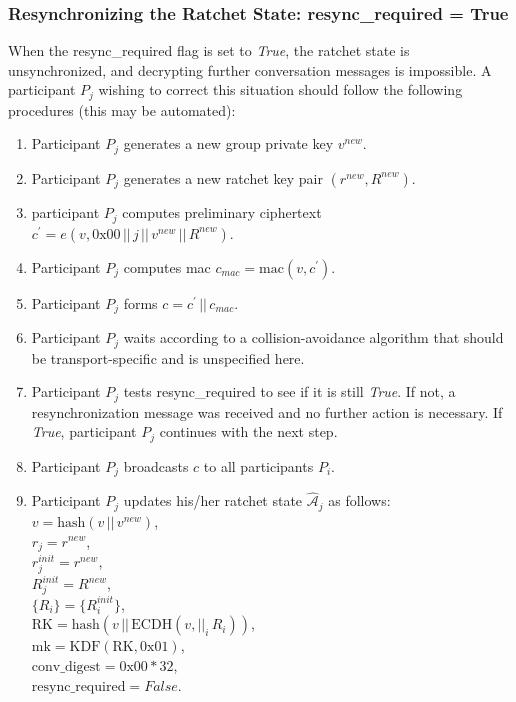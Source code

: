 \documentclass[%
preprint,
amsmath,amssymb,
aps,
prb,
floatfix,
]{revtex4-1}
\begin{document}
\subsubsection{\label{sec:sendresync}Resynchronizing the Ratchet State:
resync\_required = True}
When the resync\_required flag is set to \textit{True}, the ratchet state is
unsynchronized, and decrypting further conversation messages is impossible.
A participant $P_j$ wishing to correct this situation should follow the following
procedures (this may be automated):
\begin{enumerate}
\item Participant $P_j$ generates a new group private key $v^{new}$.
\item Participant $P_j$ generates a new ratchet key  pair $(r^{new}, R^{new})$.
\item participant $P_j$ computes preliminary ciphertext $c^\prime = e(v, 0\mathrm{x}00
\, || \, j \, || \, v^{new} \, || \, R^{new})$.
\item Participant $P_j$ computes mac $c_{mac} = \mathrm{mac}(v, c^\prime)$.
\item Participant $P_j$ forms $c = c^\prime \, || \, c_{mac}$.
\item Participant $P_j$ waits according to a collision-avoidance algorithm
that should be transport-specific and is unspecified here.
\item Participant $P_j$ tests resync\_required to see if it is still
\textit{True}. If not, a resynchronization message was received and no further
action is necessary. If \textit{True}, participant $P_j$ continues with the next
step.
\item Participant $P_j$ broadcasts $c$ to all participants $P_i$.
\item Participant $P_j$ updates his/her ratchet state
$\mathcal{\hat{A}}_j$ as follows:\\
$v = \mathrm{hash}(v \, || \, v^{new})$, \\
$r_j = r^{new}$, \\
$r_j^{init} = r^{new}$, \\
$R_j^{init} = R^{new}$, \\
$\{R_i\} = \{R_i^{init}\}$, \\
$\mathrm{RK} = \mathrm{hash}(v \, || \, \mathrm{ECDH}(v, ||_i
\, R_i))$, \\
$\mathrm{mk} = \mathrm{KDF}(\mathrm{RK}, 0\mathrm{x}01)$, \\
$\mathrm{conv\_digest} = 0\mathrm{x}00 * 32$, \\
$\mathrm{resync\_required} = False$.
\end{enumerate}
\end{document}
